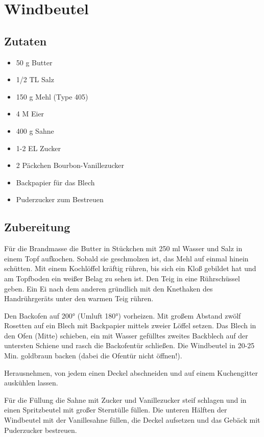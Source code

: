 \section{Windbeutel} 

\subsection*{Zutaten}

\begin{itemize}
	\item 50 g Butter
	\item 1/2 TL Salz
	\item 	150 g Mehl (Type 405)
	\item 	4 M Eier
	\item 	400 g Sahne 
	\item 	1-2 EL Zucker 
	\item 	2 Päckchen Bourbon-Vanillezucker 
	\item 	Backpapier für das Blech 
	\item 	Puderzucker zum Bestreuen
\end{itemize}

\subsection*{Zubereitung}

Für die Brandmasse die Butter in Stückchen mit 250 ml Wasser und Salz in einem Topf aufkochen. Sobald sie geschmolzen ist, das Mehl auf einmal hinein schütten. Mit einem Kochlöffel kräftig rühren, bis sich ein Kloß gebildet hat und am Topfboden ein weißer Belag zu sehen ist. Den Teig in eine Rührschüssel geben. Ein Ei nach dem anderen gründlich mit den Knethaken des Handrührgeräts unter den warmen Teig rühren. 

Den Backofen auf 200° (Umluft 180°) vorheizen. Mit großem Abstand zwölf Rosetten auf ein Blech mit Backpapier mittels zweier Löffel setzen. Das Blech in den Ofen (Mitte) schieben, ein mit Wasser gefülltes zweites Backblech auf der untersten Schiene und rasch die Backofentür schließen. Die Windbeutel in 20-25 Min. goldbraun backen (dabei die Ofentür nicht öffnen!). 

Herausnehmen, von jedem einen Deckel abschneiden und auf einem Kuchengitter auskühlen lassen.

Für die Füllung die Sahne mit Zucker und Vanillezucker steif schlagen und in einen Spritzbeutel mit großer Sterntülle füllen. Die unteren Hälften der Windbeutel mit der Vanillesahne füllen, die Deckel aufsetzen und das Gebäck mit Puderzucker bestreuen.



